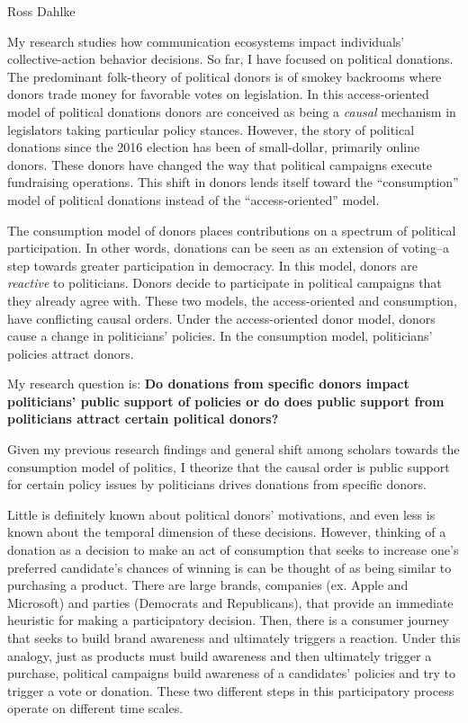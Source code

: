 \documentclass[12pt,]{article}
\author{\Large Ross Dahlke\vspace{0.05in} \newline\normalsize\emph{}  }
\date{}
\begin{document}
	
%




\vskip -8.5pt



\noindent \doublespacing 

Ross Dahlke

My research studies how communication ecosystems impact individuals'
collective-action behavior decisions. So far, I have focused on
political donations. The predominant folk-theory of political donors is
of smokey backrooms where donors trade money for favorable votes on
legislation. In this access-oriented model of political donations donors
are conceived as being a \emph{causal} mechanism in legislators taking
particular policy stances. However, the story of political donations
since the 2016 election has been of small-dollar, primarily online
donors. These donors have changed the way that political campaigns
execute fundraising operations. This shift in donors lends itself toward
the ``consumption'' model of political donations instead of the
``access-oriented'' model.

The consumption model of donors places contributions on a spectrum of
political participation. In other words, donations can be seen as an
extension of voting--a step towards greater participation in democracy.
In this model, donors are \emph{reactive} to politicians. Donors decide
to participate in political campaigns that they already agree with.
These two models, the access-oriented and consumption, have conflicting
causal orders. Under the access-oriented donor model, donors cause a
change in politicians' policies. In the consumption model, politicians'
policies attract donors.

My research question is: \textbf{Do donations from specific donors
impact politicians' public support of policies or do does public support
from politicians attract certain political donors?}

Given my previous research findings and general shift among scholars
towards the consumption model of politics, I theorize that the causal
order is public support for certain policy issues by politicians drives
donations from specific donors.

Little is definitely known about political donors' motivations, and even
less is known about the temporal dimension of these decisions. However,
thinking of a donation as a decision to make an act of consumption that
seeks to increase one's preferred candidate's chances of winning is can
be thought of as being similar to purchasing a product. There are large
brands, companies (ex. Apple and Microsoft) and parties (Democrats and
Republicans), that provide an immediate heuristic for making a
participatory decision. Then, there is a consumer journey that seeks to
build brand awareness and ultimately triggers a reaction. Under this
analogy, just as products must build awareness and then ultimately
trigger a purchase, political campaigns build awareness of a candidates'
policies and try to trigger a vote or donation. These two different
steps in this participatory process operate on different time scales.
\end{document}
